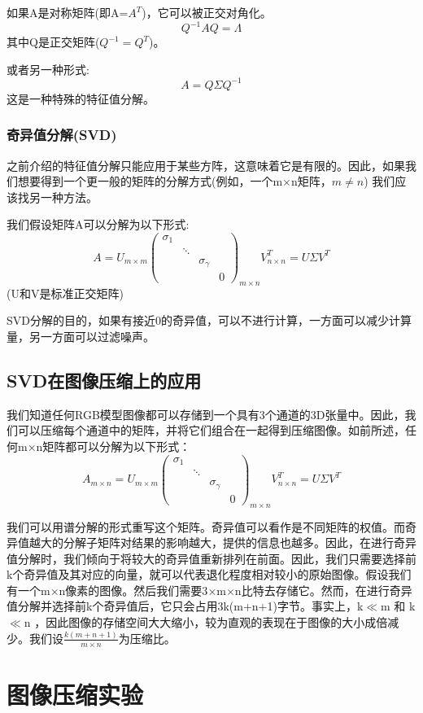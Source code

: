 \documentclass{hfutpaper}
\begin{document}
	如果A是对称矩阵(即A=$A^T$)，它可以被正交对角化。
	$$Q^{-1}AQ=\Lambda$$
	其中Q是正交矩阵($Q^{-1}=Q^T$)。
	
	或者另一种形式:
	$$A=Q\Sigma Q^{-1}$$
	这是一种特殊的特征值分解。
	\subsubsection{奇异值分解(SVD)}
	之前介绍的特征值分解只能应用于某些方阵，这意味着它是有限的。因此，如果我们想要得到一个更一般的矩阵的分解方式(例如，一个m$\times$n矩阵，$m \neq n$)
	我们应该找另一种方法\cite{1}。
	
	我们假设矩阵A可以分解为以下形式:
	$$A=U_{m\times m}
	\begin{pmatrix}
		\sigma_{1}\\
		& \ddots & &\\
		& &\sigma_{\gamma }&\\
		& & & 0
	\end{pmatrix}_{m\times n}V^T_{n\times n}=U\Sigma V^T
	$$
	(U和V是标准正交矩阵)
	
	SVD分解的目的，如果有接近0的奇异值，可以不进行计算，一方面可以减少计算量，另一方面可以过滤噪声。
	\subsection{SVD在图像压缩上的应用}
	我们知道任何RGB模型图像都可以存储到一个具有3个通道的3D张量中。因此，我们可以压缩每个通道中的矩阵，并将它们组合在一起得到压缩图像。如前所述，任何m×n矩阵都可以分解为以下形式：
		$$A_{m\times n}=U_{m\times m}
	\begin{pmatrix}
		\sigma_{1}\\
		& \ddots & &\\
		& &\sigma_{\gamma }&\\
		& & & 0
	\end{pmatrix}_{m\times n}V^T_{n\times n}=U\Sigma V^T
	$$
	
	我们可以用谱分解的形式重写这个矩阵。奇异值可以看作是不同矩阵的权值。而奇异值越大的分解子矩阵对结果的影响越大，提供的信息也越多。因此，在进行奇异值分解时，我们倾向于将较大的奇异值重新排列在前面。因此，我们只需要选择前k个奇异值及其对应的向量，就可以代表退化程度相对较小的原始图像。假设我们有一个m$\times$n像素的图像。然后我们需要3$\times$m$\times$n比特去存储它。然而，在进行奇异值分解并选择前k个奇异值后，它只会占用3k(m+n+1)字节。事实上，k$\ll$m 和 k$\ll$n ，因此图像的存储空间大大缩小，较为直观的表现在于图像的大小成倍减少。我们设$\frac{k(m+n+1)}{m\times n}$为压缩比。

	\section{图像压缩实验}
\end{document}
